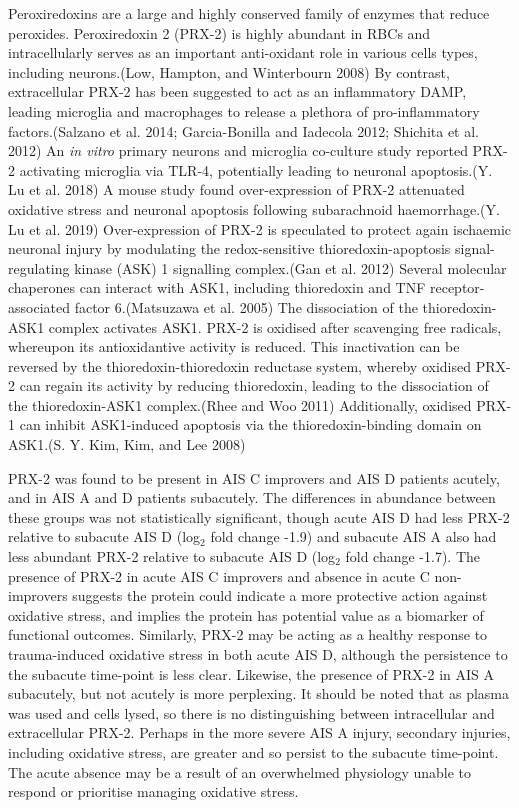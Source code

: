 \documentclass[9pt,lineno]{elife}
\begin{document}
\begin{landscape}
\begin{landscape}
Peroxiredoxins are a large and highly conserved family of enzymes that reduce peroxides.
Peroxiredoxin 2 (PRX-2) is highly abundant in RBCs and intracellularly serves as an important anti-oxidant role in various cells types, including neurons.(Low, Hampton, and Winterbourn 2008) By contrast, extracellular PRX-2 has been suggested to act as an inflammatory DAMP, leading microglia and macrophages to release a plethora of pro-inflammatory factors.(Salzano et al. 2014; Garcia-Bonilla and Iadecola 2012; Shichita et al. 2012) An \emph{in vitro} primary neurons and microglia co-culture study reported PRX-2 activating microglia via TLR-4, potentially leading to neuronal apoptosis.(Y. Lu et al. 2018) A mouse study found over-expression of PRX-2 attenuated oxidative stress and neuronal apoptosis following subarachnoid haemorrhage.(Y. Lu et al. 2019) Over-expression of PRX-2 is speculated to protect again ischaemic neuronal injury by modulating the redox-sensitive thioredoxin-apoptosis signal-regulating kinase (ASK) 1 signalling complex.(Gan et al. 2012) Several molecular chaperones can interact with ASK1, including thioredoxin and TNF receptor-associated factor 6.(Matsuzawa et al. 2005) The dissociation of the thioredoxin-ASK1 complex activates ASK1.
PRX-2 is oxidised after scavenging free radicals, whereupon its antioxidantive activity is reduced.
This inactivation can be reversed by the thioredoxin-thioredoxin reductase system, whereby oxidised PRX-2 can regain its activity by reducing thioredoxin, leading to the dissociation of the thioredoxin-ASK1 complex.(Rhee and Woo 2011) Additionally, oxidised PRX-1 can inhibit ASK1-induced apoptosis via the thioredoxin-binding domain on ASK1.(S. Y. Kim, Kim, and Lee 2008)

PRX-2 was found to be present in AIS C improvers and AIS D patients acutely, and in AIS A and D patients subacutely.
The differences in abundance between these groups was not statistically significant, though acute AIS D had less PRX-2 relative to subacute AIS D (log\(_2\) fold change -1.9) and subacute AIS A also had less abundant PRX-2 relative to subacute AIS D (log\(_2\) fold change -1.7).
The presence of PRX-2 in acute AIS C improvers and absence in acute C non-improvers suggests the protein could indicate a more protective action against oxidative stress, and implies the protein has potential value as a biomarker of functional outcomes.
Similarly, PRX-2 may be acting as a healthy response to trauma-induced oxidative stress in both acute AIS D, although the persistence to the subacute time-point is less clear.
Likewise, the presence of PRX-2 in AIS A subacutely, but not acutely is more perplexing.
It should be noted that as plasma was used and cells lysed, so there is no distinguishing between intracellular and extracellular PRX-2.
Perhaps in the more severe AIS A injury, secondary injuries, including oxidative stress, are greater and so persist to the subacute time-point.
The acute absence may be a result of an overwhelmed physiology unable to respond or prioritise managing oxidative stress.


\end{landscape}
\end{landscape}
\end{document}
